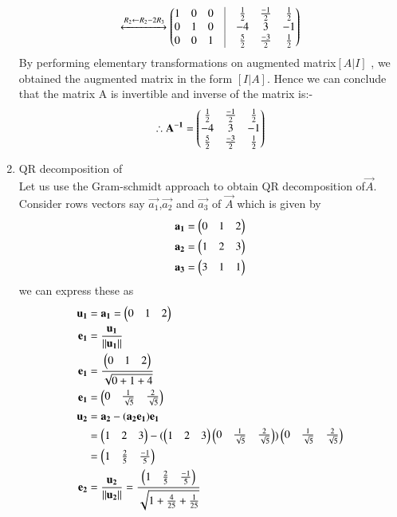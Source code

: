 \begin{enumerate}
\begin{align}
    \\
    \xleftrightarrow{R_2\leftarrow R_2-2R_3}
    \myvec{1 & 0 & 0 & \vrule & \frac{1}{2} & \frac{-1}{2} & \frac{1}{2}\\ 0 & 1 & 0 & \vrule & -4 & 3 & -1\\0 & 0 & 1 &\vrule &\frac{5}{2} &\frac{-3}{2} &\frac{1}{2}}
    \end{align}
    By performing elementary transformations on augmented matrix$ [A | I]$ , we obtained the augmented matrix in the form $ [I | A]$. 
    Hence we can conclude that the matrix A is invertible and inverse of the matrix is:-
    \begin{align}
    \therefore\mathbf{A^{-1}}=\begin{pmatrix} \frac{1}{2} & \frac{-1}{2} & \frac{1}{2} \\  -4 & 3 & -1\\ \frac{5}{2} &\frac{-3}{2} &\frac{1}{2}\end{pmatrix}
    \end{align}
    \item QR decomposition of  
    \\
     Let us use the Gram-schmidt approach to obtain QR decomposition of$ \vec{A}$. Consider rows vectors say $\vec{a_1}$,$\vec{a_2}$ and $\vec{a_3}$ of $\vec{A}$  which is given by
    \begin{align}
    \mathbf{a_1}=\begin{pmatrix}0 & 1 & 2\end{pmatrix}\label{matrix/69/eq1}\\
    \mathbf{a_2}=\begin{pmatrix}1 & 2 & 3\end{pmatrix}\label{matrix/69/eq2}\\
    \mathbf{a_3}=\begin{pmatrix}3 & 1 & 1\end{pmatrix}\label{matrix/69/eq3}
    \end{align}
    we can express these as 
    \begin{align}
    \vec{u_1}&=\vec{a_1}=\myvec{0 & 1 & 2}\label{matrix/69/eq4}\\
    \vec{e_1}&=\frac{\vec{u_1}}{\norm{\vec{u_1}}}\\
    \vec{e_1}&=\frac{\myvec{0 & 1 & 2}}{\sqrt{0+1+4}}\\
    \vec{e_1}&=\myvec{0 & \frac{1}{\sqrt{5}} & \frac{2}{\sqrt{5}}}\\
    \vec{u_2}&=\vec{a_2}-(\vec{a_2}\vec{e_1})\vec{e_1}\\
    &=\myvec{1 & 2 & 3}-(\myvec{1 & 2 & 3}\myvec{0 & \frac{1}{\sqrt{5}} & \frac{2}{\sqrt{5}}})\myvec{0 & \frac{1}{\sqrt{5}} &  \frac{2}{\sqrt{5}}}\\
    &=\myvec{1 & \frac{2}{5} & \frac{-1}{5}}\\
    \vec{e_2}&=\frac{\vec{u_2}}{\norm{\vec{u_2}}}=\frac{\myvec{1 & \frac{2}{5} & \frac{-1}{5}}}{\sqrt{1+\frac{4}{25}+\frac{1}{25}}}\\

\end{align}
\end{enumerate}
